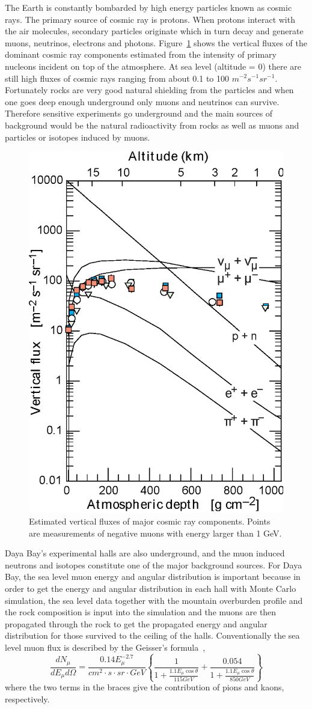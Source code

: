 The Earth is constantly bombarded by high energy particles known as cosmic rays. The primary source of cosmic ray is protons. When protons interact with the air molecules, secondary particles originate which in turn decay and generate muons, neutrinos, electrons and photons. Figure~\ref{figure:atmospheric_cosmic_rays} shows the vertical fluxes of the dominant cosmic ray components estimated from the intensity of primary nucleons incident on top of the atmosphere. At sea level (altitude = 0) there are still high fluxes of cosmic rays ranging from about 0.1 to 100 $m^{-2}s^{-1}sr^{-1}$. Fortunately rocks are very good natural shielding from the particles and when one goes deep enough underground only muons and neutrinos can survive. Therefore sensitive experiments go underground and the main sources of background would be the natural radioactivity from rocks as well as muons and particles or isotopes induced by muons.
\begin{figure}
	\centering
	\includegraphics[width=.5\textwidth]{figures/chap1/atmospheric_cosmic_rays.eps}
	\caption{Estimated vertical fluxes of major cosmic ray components. Points are measurements of negative muons with energy larger than 1 GeV.}
	\label{figure:atmospheric_cosmic_rays}
\end{figure}

Daya Bay's experimental halls are also underground, and the muon induced neutrons and isotopes constitute one of the major background sources. For Daya Bay, the sea level muon energy and angular distribution is important because in order to get the energy and angular distribution in each hall with Monte Carlo simulation, the sea level data together with the mountain overburden profile and the rock composition is input into the simulation and the muons are then propagated through the rock to get the propagated energy and angular distribution for those survived to the ceiling of the halls. Conventionally the sea level muon flux is described by the Geisser's formula~\cite{Beringer2012},
\begin{equation}
\frac{dN_\mu}{dE_\mu d\Omega}=\frac{0.14E_\mu^{-2.7}}{cm^2\cdot s \cdot sr \cdot GeV}\left\lbrace \frac{1}{1+\frac{1.1E_\mu\cos\theta}{115GeV}}+\frac{0.054}{1+\frac{1.1E_\mu\cos\theta}{850GeV}} \right\rbrace
\end{equation}
where the two terms in the braces give the contribution of pions and kaons, respectively.